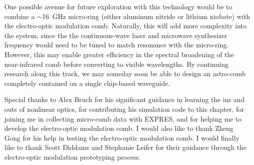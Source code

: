 One possible avenue for future exploration with this technology would be to combine a $\sim$16~\si{\giga\hertz} micro-ring (either aluminum nitride or lithium niobate) with the electro-optic modulation comb. Naturally, this will add more complexity into the system, since the the continuous-wave laser and microwave synthesizer frequency would need to be tuned to match resonance with the micro-ring. However, this may enable greater efficiency in the spectral broadening of the near-infrared comb before converting to visible wavelengths. By continuing research along this track, we may someday soon be able to design an astro-comb completely contained on a single chip-based waveguide.

Special thanks to Alex Bruch for his significant guidance in learning the ins and outs of nonlinear optics, for contributing his simulation code to this chapter, for joining me in collecting micro-comb data with EXPRES, and for helping me to develop the electro-optic modulation comb. I would also like to thank Zheng Gong for his help in testing the electro-optic modulation comb. I would finally like to thank Scott Diddams and Stephanie Leifer for their guidance through the electro-optic modulation prototyping process.